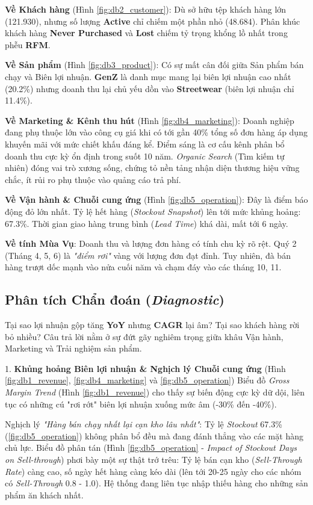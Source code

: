 \documentclass{article}
\begin{document}
\textbf{Về Khách hàng} (Hình \ref{fig:db2_customer}): Dù sở hữu tệp khách hàng lớn (121.930), nhưng số lượng \textbf{Active} chỉ chiếm một phần nhỏ (48.684). Phân khúc khách hàng \textbf{Never Purchased} và \textbf{Lost} chiếm tỷ trọng khổng lồ nhất trong phễu \textbf{RFM}.

\textbf{Về Sản phẩm} (Hình \ref{fig:db3_product}): Có sự mất cân đối giữa Sản phẩm bán chạy và Biên lợi nhuận. \textbf{GenZ} là danh mục mang lại biên lợi nhuận cao nhất (20.2\%) nhưng doanh thu lại chủ yếu dồn vào \textbf{Streetwear} (biên lợi nhuận chỉ 11.4\%).

\textbf{Về Marketing \& Kênh thu hút} (Hình \ref{fig:db4_marketing}): Doanh nghiệp đang phụ thuộc lớn vào công cụ giá khi có tới gần 40\% tổng số đơn hàng áp dụng khuyến mãi với mức chiết khấu đáng kể. Điểm sáng là cơ cấu kênh phân bổ doanh thu cực kỳ ổn định trong suốt 10 năm. \textit{Organic Search} (Tìm kiếm tự nhiên) đóng vai trò xương sống, chứng tỏ nền tảng nhận diện thương hiệu vững chắc, ít rủi ro phụ thuộc vào quảng cáo trả phí.

\textbf{Về Vận hành \& Chuỗi cung ứng} (Hình \ref{fig:db5_operation}): Đây là điểm báo động đỏ lớn nhất. Tỷ lệ hết hàng (\textit{Stockout Snapshot}) lên tới mức khủng hoảng: 67.3\%. Thời gian giao hàng trung bình (\textit{Lead Time}) khá dài, mất tới 6 ngày.

\textbf{Về tính Mùa Vụ}: Doanh thu và lượng đơn hàng có tính chu kỳ rõ rệt. Quý 2 (Tháng 4, 5, 6) là \textit{"điểm rơi"} vàng với lượng đơn đạt đỉnh. Tuy nhiên, đà bán hàng trượt dốc mạnh vào nửa cuối năm và chạm đáy vào các tháng 10, 11.

\subsection{Phân tích Chẩn đoán (\textit{Diagnostic})}

Tại sao lợi nhuận gộp tăng \textbf{YoY} nhưng \textbf{CAGR} lại âm? Tại sao khách hàng rời bỏ nhiều? Câu trả lời nằm ở sự đứt gãy nghiêm trọng giữa khâu Vận hành, Marketing và Trải nghiệm sản phẩm.

1. \textbf{Khủng hoảng Biên lợi nhuận \& Nghịch lý Chuỗi cung ứng} (Hình \ref{fig:db1_revenue}, \ref{fig:db4_marketing} và \ref{fig:db5_operation}) Biểu đồ \textit{Gross Margin Trend} (Hình \ref{fig:db1_revenue}) cho thấy sự biến động cực kỳ dữ dội, liên tục có những cú "rơi rớt" biên lợi nhuận xuống mức âm (-30\% đến -40\%).

Nghịch lý \textit{"Hàng bán chạy nhất lại cạn kho lâu nhất"}: Tỷ lệ \textit{Stockout} 67.3\% (\ref{fig:db5_operation}) không phân bổ đều mà đang đánh thẳng vào các mặt hàng chủ lực. Biểu đồ phân tán (Hình \ref{fig:db5_operation} - \textit{Impact of Stockout Days on Sell-through}) phơi bày một sự thật trớ trêu: Tỷ lệ bán cạn kho (\textit{Sell-Through Rate}) càng cao, số ngày hết hàng càng kéo dài (lên tới 20-25 ngày cho các nhóm có \textit{Sell-Through} 0.8 - 1.0). Hệ thống đang liên tục nhập thiếu hàng cho những sản phẩm ăn khách nhất.
\end{document}
